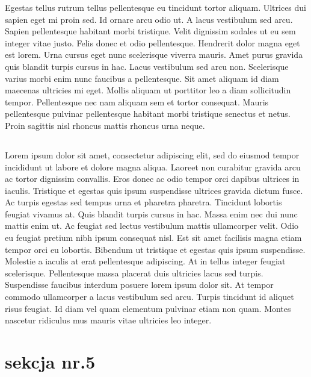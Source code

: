 \documentclass{book}
\begin{document}
Egestas tellus rutrum tellus pellentesque eu tincidunt tortor aliquam. Ultrices dui sapien eget mi proin sed. Id ornare arcu odio ut. A lacus vestibulum sed arcu. Sapien pellentesque habitant morbi tristique. Velit dignissim sodales ut eu sem integer vitae justo. Felis donec et odio pellentesque. Hendrerit dolor magna eget est lorem. Urna cursus eget nunc scelerisque viverra mauris. Amet purus gravida quis blandit turpis cursus in hac. Lacus vestibulum sed arcu non. Scelerisque varius morbi enim nunc faucibus a pellentesque. Sit amet aliquam id diam maecenas ultricies mi eget. Mollis aliquam ut porttitor leo a diam sollicitudin tempor. Pellentesque nec nam aliquam sem et tortor consequat. Mauris pellentesque pulvinar pellentesque habitant morbi tristique senectus et netus. Proin sagittis nisl rhoncus mattis rhoncus urna neque.
\subsection{}
Lorem ipsum dolor sit amet, consectetur adipiscing elit, sed do eiusmod tempor incididunt ut labore et dolore magna aliqua. Laoreet non curabitur gravida arcu ac tortor dignissim convallis. Eros donec ac odio tempor orci dapibus ultrices in iaculis. Tristique et egestas quis ipsum suspendisse ultrices gravida dictum fusce. Ac turpis egestas sed tempus urna et pharetra pharetra. Tincidunt lobortis feugiat vivamus at. Quis blandit turpis cursus in hac. Massa enim nec dui nunc mattis enim ut. Ac feugiat sed lectus vestibulum mattis ullamcorper velit. Odio eu feugiat pretium nibh ipsum consequat nisl. Est sit amet facilisis magna etiam tempor orci eu lobortis. Bibendum ut tristique et egestas quis ipsum suspendisse. Molestie a iaculis at erat pellentesque adipiscing. At in tellus integer feugiat scelerisque. Pellentesque massa placerat duis ultricies lacus sed turpis. Suspendisse faucibus interdum posuere lorem ipsum dolor sit. At tempor commodo ullamcorper a lacus vestibulum sed arcu. Turpis tincidunt id aliquet risus feugiat. Id diam vel quam elementum pulvinar etiam non quam. Montes nascetur ridiculus mus mauris vitae ultricies leo integer.

\section{sekcja nr.5}
\lipsum
\lipsum[2-12]
\end{document}
